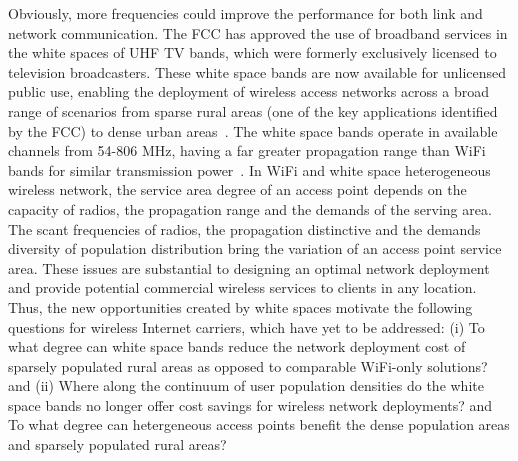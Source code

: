 Obviously, more frequencies could improve the performance for both link and network communication.
The FCC has approved the use of broadband services in the white spaces of 
UHF TV bands, which were formerly exclusively licensed to television broadcasters.
These white space bands are now available for unlicensed public use, enabling the
deployment of wireless access networks across a broad range of scenarios from 
sparse rural areas (one of the key applications identified by the FCC) to dense urban 
areas~\cite{carlson}. The white space bands operate in available channels from 
54-806 MHz, having a far greater propagation range than WiFi bands for similar
transmission power~\cite{balanis2012antenna}. 
In WiFi and white space heterogeneous wireless network, the service area degree of 
an access point depends on the capacity of radios, the propagation range and the 
demands of the serving area. The scant frequencies of radios, the propagation distinctive
and the demands diversity of population distribution bring the variation of an access point
service area. These issues are substantial to designing an optimal network deployment 
and provide potential commercial wireless services to clients in any location.
Thus, the new opportunities created by white spaces motivate the following 
questions for wireless Internet carriers, which have yet to be addressed: 
(i) To what degree can white space bands reduce the network deployment cost of
sparsely populated rural areas as opposed to comparable WiFi-only solutions? and 
(ii) Where along the continuum of user population densities do the white
space bands no longer offer cost savings for wireless network deployments?
and To what degree can hetergeneous access points benefit the dense 
population areas and sparsely populated rural areas?


